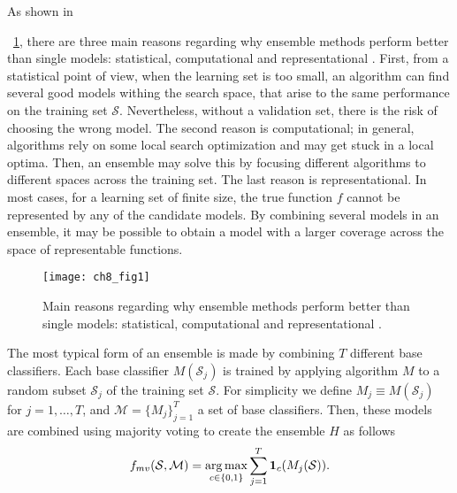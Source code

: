 As shown in \figurename{~\ref{fig:8:1}, there are three main reasons regarding why ensemble 
methods perform better than single models: statistical, computational and representational 
\citep{Dietterich2000a}. First, from a statistical point of view, when the learning set is too 
small, an algorithm can find several good models withing the search space, that arise to the same 
performance on the training set $\mathcal{S}$. Nevertheless, without a validation set, there is 
the risk of choosing the wrong model. The second reason is computational; in general, algorithms 
rely on some local search optimization and may get stuck in a local optima. Then, an ensemble may 
solve this by focusing different algorithms to different spaces across the training set. The last 
reason is representational. In most cases, for a learning set of finite size, the  true function 
$f$ cannot be represented by any of the candidate models. By combining several  models in an 
ensemble, it may be possible to obtain a model with a larger coverage across the  space of 
representable functions.
  
\begin{figure}[t!]
\texttt{[image: ch8\_fig1]}
\caption{Main reasons regarding why ensemble methods perform better than 
  single models: statistical, computational and representational \citep{Dietterich2000a}.}
\label{fig:8:1}
\end{figure} 
  
  The most typical form of an ensemble is made by combining $T$ different base classifiers.
  Each  base classifier $M(\mathcal{S}_j)$ is trained by applying algorithm $M$ to a random subset 
  $\mathcal{S}_j$ of the training set $\mathcal{S}$.  %
  For simplicity we define $M_j \equiv  M(\mathcal{S}_j)$ for $j=1,\dots,T$, and 
  $\mathcal{M}=\{M_j\}_{j=1}^{T}$ a set of base classifiers.
  Then, these models are combined using majority voting to create the ensemble $H$ as follows
  \begin{align}\label{eq:8:majority-vote}
    f_{mv}(\mathcal{S},\mathcal{M}) = \operatorname*{arg\,max}_{c \in \{0,1\}} \sum_{j=1}^T 
    \mathbf{1}_c(M_j(\mathcal{S})).
  \end{align}

}
